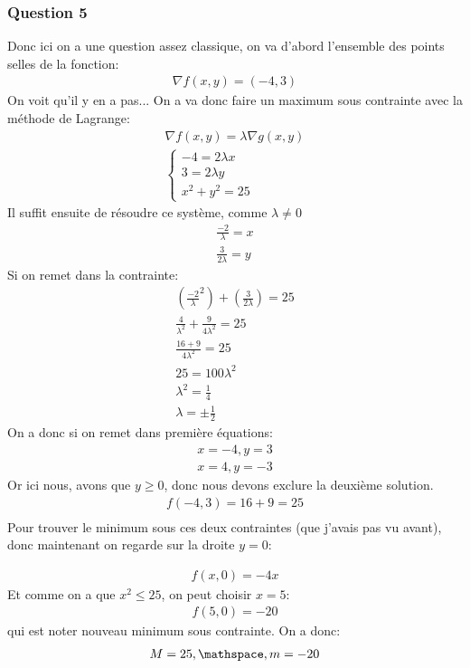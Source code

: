 \documentclass[a4paper]{article}
\begin{document}
\subsubsection{Question 5}
Donc ici on a une question assez classique, on va d'abord l'ensemble des points selles de la fonction:
\begin{align*} 
    \nabla f \left(x, y\right)  = \left(-4, 3\right)
\end{align*}
On voit qu'il y en a pas... On a va donc faire un maximum sous contrainte avec la méthode de Lagrange:
\begin{align*} 
    \nabla f \left(x, y\right) =  \lambda \nabla g \left(x, y\right)\\
    \begin{cases}
        -4= 2\lambda x\\
        3 = 2 \lambda y\\
        x^2 + y^2 = 25
    \end{cases}
\end{align*}
Il suffit ensuite de résoudre ce système, comme $\lambda \neq 0$
\begin{align*} 
 \frac{-2}{\lambda} =  x\\
 \frac{3}{2 \lambda} =  y
\end{align*}
Si on remet dans la contrainte:
\begin{align*} \left(\frac{-2}{\lambda}^2\right) + \left(\frac{3}{2 \lambda}\right) = 25\\
    \frac{4}{\lambda^2} + \frac{9}{4\lambda^2} = 25\\
    \frac{16 + 9}{4 \lambda^2} =  25\\
    25 = 100 \lambda^2\\
    \lambda^2 = \frac{1}{4}\\
    \lambda = \pm \frac{1}{2}
\end{align*}
On a donc si on remet dans première équations:
\begin{align*} 
    x =  -4, y = 3\\
    x =  4, y = -3
\end{align*}
Or ici nous, avons que $y \geq 0$, donc nous devons exclure la deuxième solution.
\begin{align*} 
    f\left(-4, 3\right) = 16 + 9 = 25\\
\end{align*}
Pour trouver le minimum sous ces deux contraintes (que j'avais pas vu avant), donc maintenant on regarde sur la droite $y = 0$:

\begin{align*} 
 f\left(x, 0\right) = -4x
\end{align*}
Et comme on a que $x^2 \leq 25$, on peut choisir $x =  5$:
\begin{align*} 
    f \left(5, 0\right) =  -20
\end{align*}
qui est noter nouveau minimum sous contrainte. On a donc:
\begin{align*} 
    M =  25, \mathspace, m = -20
\end{align*}
\end{document}
